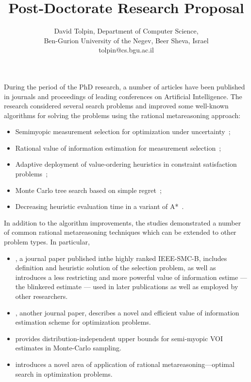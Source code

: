 \documentclass{article}
\title{Post-Doctorate Research Proposal}
\author {David Tolpin,
Department of Computer Science, \\
Ben-Gurion University of the Negev, Beer Sheva, Israel \\
tolpin@cs.bgu.ac.il}
\begin{document}
\maketitle

During the period of the PhD research, a number of articles have
been published in journals and proceedings of leading
conferences on Artificial Intelligence. The research considered
several search problems and improved some 
well-known algorithms for solving the problems using the rational
metareasoning approach:
\begin {itemize}
\item Semimyopic measurement selection for optimization under
  uncertainty~\cite{TolpinShimony.blinkered};
\item Rational value of information estimation for measurement
		  selection~\cite{TolpinShimony.raticomp};
\item Adaptive deployment of value-ordering heuristics in constraint
  satisfaction problems~\cite{TolpinShimony.csp};
\item Monte Carlo tree search based on simple regret~\cite{TolpinShimony.mcts,HayRussellTolpinShimony.selecting};
\item Decreasing heuristic evaluation time in a variant of A*~\cite{TolpinEtAl.rla}. 
\end {itemize}
In addition to the algorithm improvements, the studies demonstrated a
number of common rational metareasoning techniques which can be 
extended to other problem types. In particular,
\begin{itemize}
\item \cite{TolpinShimony.blinkered}, a journal paper published inthe
  highly ranked IEEE-SMC-B, includes definition and heuristic 
  solution of the selection problem, as well as introduces a less
  restricting and more powerful value of information estime --- the
  blinkered estimate --- used in later publications as well as employed by other
  researchers.
\item \cite{TolpinShimony.raticomp}, another journal paper, describes a novel and
  efficient value of information estimation scheme for optimization problems. 
\item \cite{HayRussellTolpinShimony.selecting} provides
  distribution-independent upper bounds for semi-myopic VOI estimates in Monte-Carlo sampling.
\item \cite{TolpinEtAl.rla} introduces a novel area of application of rational
metareasoning---optimal search in optimization problems.
\end{itemize}
\end{document}
